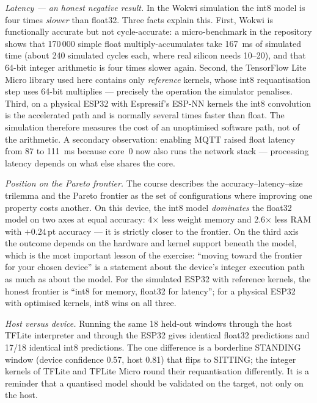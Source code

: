 \documentclass[10pt,a4paper]{article}
\begin{document}
\emph{Latency --- an honest negative result.} In the Wokwi simulation the int8 model is four times \emph{slower} than float32. Three facts explain this. First, Wokwi is functionally accurate but not cycle-accurate: a micro-benchmark in the repository shows that 170\,000 simple float multiply-accumulates take \SI{167}{ms} of simulated time (about 240 simulated cycles each, where real silicon needs 10--20), and that 64-bit integer arithmetic is four times slower again. Second, the TensorFlow Lite Micro library used here contains only \emph{reference} kernels, whose int8 requantisation step uses 64-bit multiplies --- precisely the operation the simulator penalises. Third, on a physical ESP32 with Espressif's ESP-NN kernels the int8 convolution is the accelerated path and is normally several times faster than float. The simulation therefore measures the cost of an unoptimised software path, not of the arithmetic. A secondary observation: enabling MQTT raised float latency from 87 to \SI{111}{ms} because core~0 now also runs the network stack --- processing latency depends on what else shares the core.

\emph{Position on the Pareto frontier.} The course describes the accuracy--latency--size trilemma and the Pareto frontier as the set of configurations where improving one property costs another. On this device, the int8 model \emph{dominates} the float32 model on two axes at equal accuracy: 4$\times$ less weight memory and 2.6$\times$ less RAM with $+0.24$\,pt accuracy --- it is strictly closer to the frontier. On the third axis the outcome depends on the hardware and kernel support beneath the model, which is the most important lesson of the exercise: ``moving toward the frontier for your chosen device'' is a statement about the device's integer execution path as much as about the model. For the simulated ESP32 with reference kernels, the honest frontier is ``int8 for memory, float32 for latency''; for a physical ESP32 with optimised kernels, int8 wins on all three.

\emph{Host versus device.} Running the same 18 held-out windows through the host TFLite interpreter and through the ESP32 gives identical float32 predictions and 17/18 identical int8 predictions. The one difference is a borderline STANDING window (device confidence 0.57, host 0.81) that flips to SITTING; the integer kernels of TFLite and TFLite Micro round their requantisation differently. It is a reminder that a quantised model should be validated on the target, not only on the host.
\end{document}
